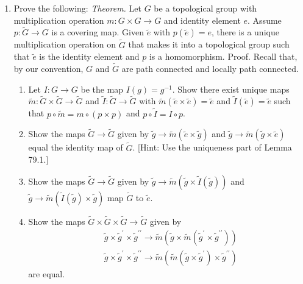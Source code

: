 \begin{enumerate}[itemsep=0.4em, parsep=0pt, topsep=0pt, partopsep=0pt, leftmargin=*, label=\arabic*., ref=\arabic*]
\begin{enumerate}[itemsep=0.2em, parsep=0pt, topsep=0pt, partopsep=0pt, leftmargin=*, label=(\alph*), align=left]
 \end{enumerate}
\item[*6.] Prove the following: \textsl{Theorem.} Let \(G\) be a topological group with multiplication operation \(m : G \times G \rightarrow G\) and identity element \(e\). Assume \(p : \widetilde{G} \rightarrow G\) is a covering map. Given \(\widetilde{e}\) with \(p( \widetilde{e}) = e\), there is a unique multiplication operation on \(\widetilde{G}\) that makes it into a topological group such that \(\widetilde{e}\) is the identity element and \(p\) is a homomorphism. Proof. Recall that, by our convention, \(G\) and \(\widetilde{G}\) are path connected and locally path connected.
 \begin{enumerate}[itemsep=0.2em, parsep=0pt, topsep=0pt, partopsep=0pt, leftmargin=*, label=(\alph*), align=left]
 \item Let \(I : G \rightarrow G\) be the map \(I( g) = g^{-1}\). Show there exist unique maps \(\widetilde{m} : \widetilde{G} \times \widetilde{G} \rightarrow \widetilde{G}\) and \(\widetilde{I} : \widetilde{G} \rightarrow \widetilde{G}\) with \(\widetilde{m}( {\widetilde{e} \times \widetilde{e}}) = \widetilde{e}\) and \(\widetilde{I}( \widetilde{e}) = \widetilde{e}\) such that \(p \circ \widetilde{m} = m \circ ( {p \times p})\) and \(p \circ \widetilde{I} = I \circ p\).
 \item Show the maps \(\widetilde{G} \rightarrow \widetilde{G}\) given by \(\widetilde{g} \rightarrow \widetilde{m}( {\widetilde{e} \times \widetilde{g}})\) and \(\widetilde{g} \rightarrow \widetilde{m}( {\widetilde{g} \times \widetilde{e}})\) equal the identity map of \(\widetilde{G}\). [Hint: Use the uniqueness part of Lemma 79.1.]
 \item Show the maps \(\widetilde{G} \rightarrow \widetilde{G}\) given by \(\widetilde{g} \rightarrow \widetilde{m}( {\widetilde{g} \times \widetilde{I}( \widetilde{g}) })\) and \(\widetilde{g} \rightarrow \widetilde{m}( {\widetilde{I}( \widetilde{g}) \times \widetilde{g}})\) map \(\widetilde{G}\) to \(\widetilde{e}\).
 \item Show the maps \(\widetilde{G} \times \widetilde{G} \times \widetilde{G} \rightarrow \widetilde{G}\) given by \[ \begin{aligned} & \widetilde{g} \times {\widetilde{g}}^{\prime } \times {\widetilde{g}}^{\prime \prime } \rightarrow \widetilde{m}( {\widetilde{g} \times \widetilde{m}( {\widetilde{g}^{\prime } \times {\widetilde{g}}^{\prime \prime }}) }) \\ & \widetilde{g} \times {\widetilde{g}}^{\prime } \times {\widetilde{g}}^{\prime \prime } \rightarrow \widetilde{m}( {\widetilde{m}( {\widetilde{g} \times {\widetilde{g}}^{\prime }}) \times {\widetilde{g}}^{\prime \prime }}) \end{aligned} \] are equal.

\end{enumerate}
\end{enumerate}

